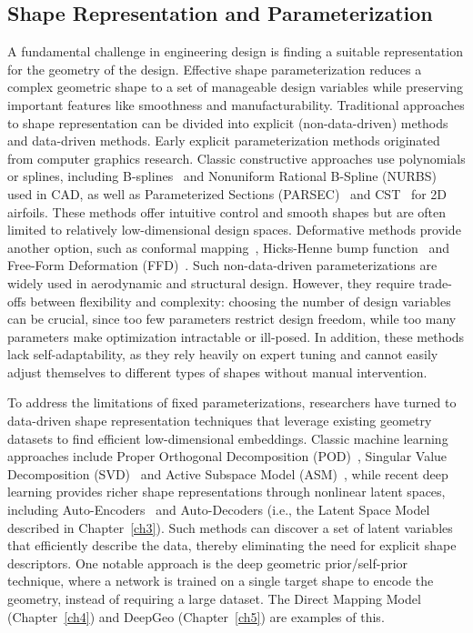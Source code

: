 \subsection{Shape Representation and Parameterization}
A fundamental challenge in engineering design is finding a suitable representation for the geometry of the design. Effective shape parameterization reduces a complex geometric shape to a set of manageable design variables while preserving important features like smoothness and manufacturability. Traditional approaches to shape representation can be divided into explicit (non-data-driven) methods and data-driven methods.
Early explicit parameterization methods originated from computer graphics research. Classic constructive approaches use polynomials or splines, including B-splines~\cite{aa.Braibant1984} and Nonuniform Rational B-Spline (NURBS)~\cite{aa.Farin1995} used in CAD, as well as Parameterized Sections (PARSEC)~\cite{aa.Sobieczky1999} and CST~\cite{aa.Kulfan2008} for 2D airfoils. These methods offer intuitive control and smooth shapes but are often limited to relatively low-dimensional design spaces. Deformative methods provide another option, such as conformal mapping~\cite{aa.Jameson1988}, Hicks-Henne bump function~\cite{aa.Hicks1978} and Free-Form Deformation (FFD)~\cite{aa.Sederberg1986, aa.Kenway2010}. Such non-data-driven parameterizations are widely used in aerodynamic and structural design. However, they require trade-offs between flexibility and complexity: choosing the number of design variables can be crucial, since too few parameters restrict design freedom, while too many parameters make optimization intractable or ill-posed. In addition, these methods lack self-adaptability, as they rely heavily on expert tuning and cannot easily adjust themselves to different types of shapes without manual intervention.

To address the limitations of fixed parameterizations, researchers have turned to data-driven shape representation techniques that leverage existing geometry datasets to find efficient low-dimensional embeddings. Classic machine learning approaches include Proper Orthogonal Decomposition (POD)~\cite{aa.Robinson2001}, Singular Value Decomposition (SVD)~\cite{aa.Poole2015,aa.Li2019,aa.Kedward2020} and Active Subspace Model (ASM)~\cite{aa.Constantine2014,aa.Li2019b,aa.Lukaczyk2014,aa.Namura2017,aa.Grey2018}, while recent deep learning provides richer shape representations through nonlinear latent spaces, including Auto-Encoders~\cite{aa.DAgostino2018,aa.Rios2021,aa.Li2020} and Auto-Decoders (i.e., the Latent Space Model described in Chapter~\ref{ch3}). Such methods can discover a set of latent variables that efficiently describe the data, thereby eliminating the need for explicit shape descriptors. One notable approach is the deep geometric prior/self-prior technique, where a network is trained on a single target shape to encode the geometry, instead of requiring a large dataset. The Direct Mapping Model (Chapter~\ref{ch4}) and DeepGeo (Chapter~\ref{ch5}) are examples of this.

